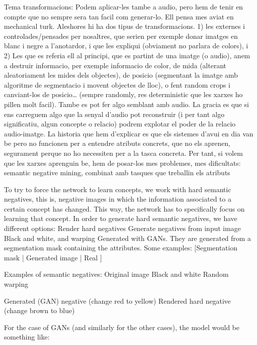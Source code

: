Tema transformacions: Podem aplicar-les tambe a audio, pero hem de tenir en compte que no sempre sera tan facil com generar-lo. Ell pensa mes aviat en mechanical turk. 
Aleshores hi ha dos tipus de transformacions. 1) les externes i controlades/pensades per nosaltres, que serien per exemple donar imatges en blanc i negre a l’anotardor, i que les expliqui (obviament no parlara de colors), i 2) Les que es referia ell al principi, que es partint de una imatge (o audio), anem a destruir informacio, per exemple informacio de color, de mida (alterant aleatoriament les mides dels objectes), de posicio (segmentant la imatge amb algoritme de segmentacio i movent objectes de lloc), o fent random crops i canviant-los de posicio… (sempre randomly, res deterministic que les xarxes ho pillen molt facil). Tambe es pot fer algo semblant amb audio. La gracia es que si ens carreguem algo que la senyal d’audio pot reconstruir (i per tant algo significatiu, algun concepte o relacio) podrem explotar el poder de la relacio audio-imatge.
La historia que hem d’explicar es que els sistemes d’avui en dia van be pero no funcionen per a entendre atributs concrets, que no els aprenen, segurament perque no ho necessiten per a la tasca concreta. Per tant, si volem que les xarxes aprenguin be, hem de posar-los mes problemes, mes dificultats: semantic negative mining, combinat amb tasques que treballin els atributs

To try to force the network to learn concepts, we work with hard semantic negatives, this is, negative images in which the information associated to a certain concept has changed. This way, the network has to specifically focus on learning that concept. In order to generate hard semantic negatives, we have different options:
Render hard negatives
Generate negatives from input image
Black and white, and warping
Generated with GANs. They are generated from a segmentation mask containing the attributes. Some examples: [Segmentation mask | Generated image | Real ]


Examples of semantic negatives:
Original image
Black and white
Random warping



Generated (GAN) negative
(change red to yellow)
Rendered hard negative (change brown to blue)






For the case of GANs (and similarly for the other cases), the model would be something like:

